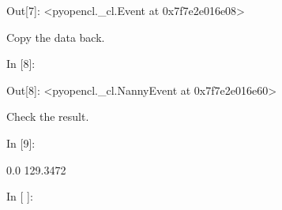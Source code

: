 \begin{BGVerbatim}[commandchars=\\\{\}]
{\color{outcolor}Out[{\color{outcolor}7}]:} <pyopencl.\_cl.Event at 0x7f7e2e016e08>
\end{BGVerbatim}
            
    Copy the data back.

    \begin{BGVerbatim}[commandchars=\\\{\}]
{\color{incolor}In [{\color{incolor}8}]:}   
        
          
\end{BGVerbatim}

\begin{BGVerbatim}[commandchars=\\\{\}]
{\color{outcolor}Out[{\color{outcolor}8}]:} <pyopencl.\_cl.NannyEvent at 0x7f7e2e016e60>
\end{BGVerbatim}
            
    Check the result.

    \begin{BGVerbatim}[commandchars=\\\{\}]
{\color{incolor}In [{\color{incolor}9}]:}    
\end{BGVerbatim}

    \begin{BGVerbatim}[commandchars=\\\{\}]
0.0 129.3472

    \end{BGVerbatim}

    \begin{BGVerbatim}[commandchars=\\\{\}]
{\color{incolor}In [{\color{incolor} }]:} 
\end{BGVerbatim}


    
